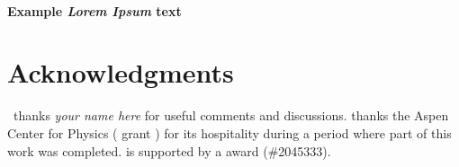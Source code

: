 \documentclass[12pt]{article}
\begin{document}
\paragraph{Example \emph{Lorem Ipsum} text} \lipsum[5]









\section*{Acknowledgments}

\ thanks 
\emph{your name here}
for useful comments and discussions. 
%
 thanks 
    the Aspen Center for Physics ( grant )
    for 
    its 
    hospitality during a period where part of this work was completed. 
%
 is supported by a  award (\#2045333).


 
% 

\end{document}

